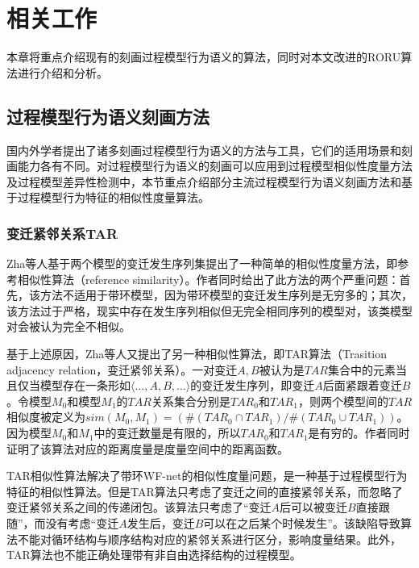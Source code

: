 
\chapter{相关工作}\label{cha:related_work}
本章将重点介绍现有的刻画过程模型行为语义的算法，同时对本文改进的RORU算法进行介绍和分析。

\section{过程模型行为语义刻画方法}\label{sec:related_algorithms}
国内外学者提出了诸多刻画过程模型行为语义的方法与工具，它们的适用场景和刻画能力各有不同。对过程模型行为语义的刻画可以应用到过程模型相似性度量方法及过程模型差异性检测中，本节重点介绍部分主流过程模型行为语义刻画方法和基于过程模型行为特征的相似性度量算法。

\subsection{变迁紧邻关系TAR}\label{subsec:tar}
Zha等人基于两个模型的变迁发生序列集提出了一种简单的相似性度量方法，即参考相似性算法（reference similarity）\cite{zha2010workflow}。作者同时给出了此方法的两个严重问题：首先，该方法不适用于带环模型，因为带环模型的变迁发生序列是无穷多的；其次，该方法过于严格，现实中存在发生序列相似但无完全相同序列的模型对，该类模型对会被认为完全不相似。

基于上述原因，Zha等人又提出了另一种相似性算法，即TAR算法（Trasition adjacency relation，变迁紧邻关系）。一对变迁$A,B$被认为是$TAR$集合中的元素当且仅当模型存在一条形如$\langle ...,A,B,...\rangle$的变迁发生序列，即变迁$A$后面紧跟着变迁$B$。令模型$M_{0}$和模型$M_{1}$的$TAR$关系集合分别是$TAR_{0}$和$TAR_{1}$，则两个模型间的$TAR$相似度被定义为$sim(M_{0},M_{1})=(\#(TAR_{0}\cap TAR_{1})/\#(TAR_{0}\cup TAR_{1}))$。因为模型$M_{0}$和$M_{1}$中的变迁数量是有限的，所以$TAR_{0}$和$TAR_{1}$是有穷的。作者同时证明了该算法对应的距离度量是度量空间中的距离函数。

TAR相似性算法解决了带环WF-net的相似性度量问题，是一种基于过程模型行为特征的相似性算法。但是TAR算法只考虑了变迁之间的直接紧邻关系，而忽略了变迁紧邻关系之间的传递闭包。该算法只考虑了“变迁$A$后可以被变迁$B$直接跟随”，而没有考虑“变迁$A$发生后，变迁$B$可以在之后某个时候发生”。该缺陷导致算法不能对循环结构与顺序结构对应的紧邻关系进行区分，影响度量结果。此外，TAR算法也不能正确处理带有非自由选择结构的过程模型。

